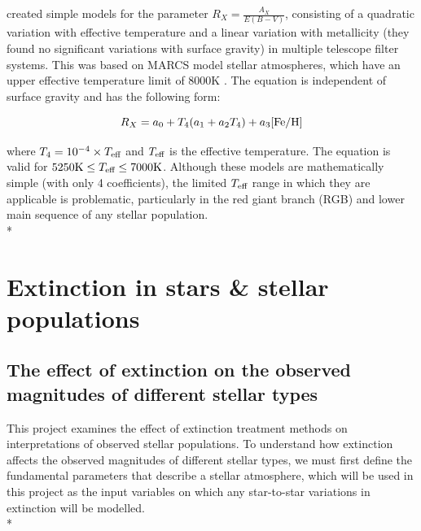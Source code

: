 \documentclass[12pt, a4paper]{report}
\begin{document}
\cite{2014MNRAS.444..392C,2018MNRAS.475.5023C,2018MNRAS.479L.102C} created simple  models for the parameter $R_{X}  = \frac{A_{X}}{E(B-V)}$, consisting of a quadratic variation with effective temperature and a linear variation with metallicity (they found no significant variations with surface gravity) in multiple telescope filter systems. This was based on MARCS model stellar atmospheres, which have an upper effective temperature limit of 8000K \citep{2008A&A...486..951G}. The equation is independent of surface gravity and has the following form:

\begin{equation}
R_{X} = a_{0} + T_{4}(a_{1} + a_{2}T_{4}) + a_{3}\textnormal{[Fe/H]}
\label{casagrande_ext_fit}
\end{equation}

where $T_{4} = 10^{-4} \times T_{\textnormal{eff}}$ and $T_{\textnormal{eff}}$ is the effective temperature. The equation is valid for $5250\textnormal{K} \leq T_{\textnormal{eff}} \leq 7000\textnormal{K}$. Although these models are mathematically simple (with only 4 coefficients), the limited $T_{\textnormal{eff}}$ range in which they are applicable is problematic, particularly in the red giant branch (RGB) and lower main sequence of any stellar population.\\*

\section{Extinction in stars \& stellar populations}

\subsection{The effect of extinction on the observed magnitudes of different stellar types} \label{params}


This project examines the effect of extinction treatment methods on interpretations of observed stellar populations. To understand how extinction affects the observed magnitudes of different stellar types, we must first define the fundamental parameters that describe a stellar atmosphere, which will be used in this project as the input variables on which any star-to-star variations in extinction will be modelled. \\*
\end{document}
